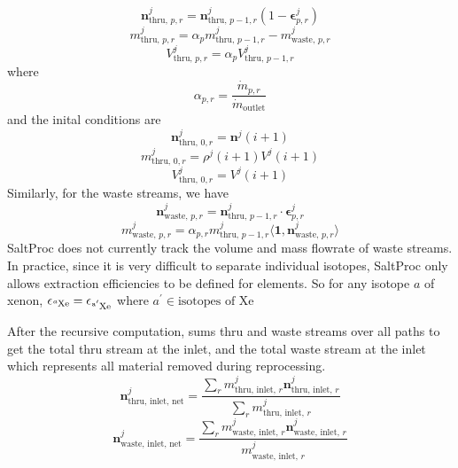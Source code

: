 \begin{equation}
    \mathbf{n}^{j}_{\text{thru, }p,r} = \mathbf{n}^{j}_{\text{thru, }p-1,r} (1 - \pmb{\epsilon}^{j}_{p,r})
\end{equation}
\begin{equation}
    m^{j}_{\text{thru, } p,r} = \alpha_{p} m^{j}_{\text{thru, }p-1,r} - m^{j}_{\text{waste, }p,r}
\end{equation}
\begin{equation}
    V^{j}_{\text{thru, }p,r} = \alpha_{p}V^{j}_{\text{thru, }p-1,r}
\end{equation}
where 
\begin{equation}
    \alpha_{p,r} = \frac{\dot{m}_{p,r}}{\dot{m}_{\text{outlet}}}
\end{equation}
and the inital conditions are 
\begin{equation}
    \mathbf{n}^{j}_{\text{thru, }0,r} = \mathbf{n}^{j}(i+1)
\end{equation}
\begin{equation}
    m^{j}_{\text{thru, }0,r} = \rho^{j}(i+1)V^{j}(i+1)
\end{equation}
\begin{equation}
    V^{j}_{\text{thru, }0,r} = V^{j}(i+1)
\end{equation}
Similarly, for the waste streams, we have
\begin{equation}
    \mathbf{n}^{j}_{\text{waste, }p,r} = \mathbf{n}^{j}_{\text{thru, }p-1,r} \cdot \pmb{\epsilon}^{j}_{p,r}
\end{equation}
\begin{equation}
    m^{j}_{\text{waste, }p,r} = \alpha_{p,r} m^{j}_{\text{thru, }p-1,r} \langle\mathbf{1},\mathbf{n}^{j}_{\text{waste, }p,r}\rangle
\end{equation}
SaltProc does not currently track the volume and mass flowrate of waste streams.
In practice, since it is very difficult to separate individual isotopes,
SaltProc only allows extraction efficiencies to be defined for elements. So for
any isotope $a$ of xenon,
$\epsilon_{\ce{^{a}Xe}} = \epsilon_{\ce{^{a^{\prime}}Xe}}$  where
$a^{\prime} \in \text{isotopes of Xe}$

After the recursive computation, \SaltProc sums thru and waste streams over all
paths to get the total thru stream at the inlet, and the total waste stream at
the inlet which represents all material removed during reprocessing.
\begin{equation}
    \mathbf{n}^{j}_\text{thru, inlet, net} = \frac{\sum_{r} m^{j}_{\text{thru, inlet, }r} \mathbf{n}^{j}_{\text{thru, inlet, }r}}{\sum_{r} m^{j}_{\text{thru, inlet, }r}}
\end{equation}
\begin{equation}
    \mathbf{n}^{j}_{\text{waste, inlet, net}} = \frac{\sum_{r} m^{j}_{\text{waste, inlet, }r} \mathbf{n}^{j}_{\text{waste, inlet, }r}}{m^{j}_{\text{waste, inlet, }r}}
\end{equation}


